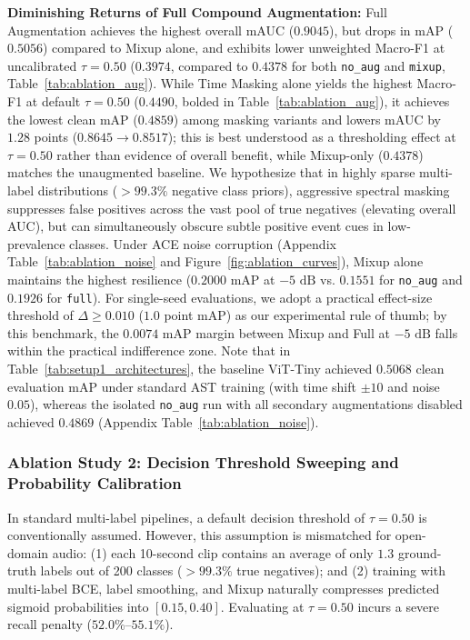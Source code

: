\documentclass[11pt,a4paper]{article}
\begin{document}
\textbf{Diminishing Returns of Full Compound Augmentation:} Full Augmentation achieves the highest overall mAUC ($0.9045$), but drops in mAP ($0.5056$) compared to Mixup alone, and exhibits lower unweighted Macro-F1 at uncalibrated $\tau=0.50$ ($0.3974$, compared to $0.4378$ for both \texttt{no\_aug} and \texttt{mixup}, Table~\ref{tab:ablation_aug}). While Time Masking alone yields the highest Macro-F1 at default $\tau=0.50$ ($0.4490$, bolded in Table~\ref{tab:ablation_aug}), it achieves the lowest clean mAP ($0.4859$) among masking variants and lowers mAUC by $1.28$ points ($0.8645 \to 0.8517$); this is best understood as a thresholding effect at $\tau=0.50$ rather than evidence of overall benefit, while Mixup-only ($0.4378$) matches the unaugmented baseline. We hypothesize that in highly sparse multi-label distributions ($>99.3\%$ negative class priors), aggressive spectral masking suppresses false positives across the vast pool of true negatives (elevating overall AUC), but can simultaneously obscure subtle positive event cues in low-prevalence classes. Under ACE noise corruption (Appendix Table~\ref{tab:ablation_noise} and Figure~\ref{fig:ablation_curves}), Mixup alone maintains the highest resilience ($0.2000$ mAP at $-5\text{ dB}$ vs. $0.1551$ for \texttt{no\_aug} and $0.1926$ for \texttt{full}). For single-seed evaluations, we adopt a practical effect-size threshold of $\Delta \ge 0.010$ ($1.0$ point mAP) as our experimental rule of thumb; by this benchmark, the $0.0074$ mAP margin between Mixup and Full at $-5\text{ dB}$ falls within the practical indifference zone. Note that in Table~\ref{tab:setup1_architectures}, the baseline ViT-Tiny achieved $0.5068$ clean evaluation mAP under standard AST training (with time shift $\pm 10$ and noise $0.05$), whereas the isolated \texttt{no\_aug} run with all secondary augmentations disabled achieved $0.4869$ (Appendix Table~\ref{tab:ablation_noise}).

\subsubsection{Ablation Study 2: Decision Threshold Sweeping and Probability Calibration}
\label{sec:threshold_sweeping}
In standard multi-label pipelines, a default decision threshold of $\tau = 0.50$ is conventionally assumed. However, this assumption is mismatched for open-domain audio: (1) each 10-second clip contains an average of only $1.3$ ground-truth labels out of 200 classes ($>99.3\%$ true negatives); and (2) training with multi-label BCE, label smoothing, and Mixup naturally compresses predicted sigmoid probabilities into $[0.15, 0.40]$. Evaluating at $\tau = 0.50$ incurs a severe recall penalty ($52.0\%\text{--}55.1\%$).
\end{document}
